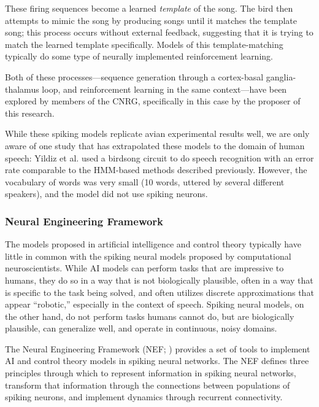 \documentclass{article}
\begin{document}
\begin{figure}\begin{center}
  \label{fig:birdsong}
  \caption{}
\end{center}\end{figure}

These firing sequences become
a learned \textit{template} of the song.
The bird then attempts to mimic the song
by producing songs until it matches
the template song;
this process occurs without
external feedback,
suggesting that it is trying
to match the learned template specifically.
Models of this template-matching
typically do some type of neurally
implemented reinforcement learning.

Both of these processes---sequence generation
through a cortex-basal ganglia-thalamus loop,
and reinforcement learning in the same context---have
been explored by members of the CNRG,
specifically in this case by
the proposer of this research.

While these spiking models
replicate avian experimental results well,
we are only aware of one study that
has extrapolated these models
to the domain of human speech:
Yildiz et al. used a birdsong
circuit to do speech recognition
with an error rate comparable
to the HMM-based methods described previously.
However, the vocabulary of words was very small
(10 words, uttered by several different speakers),
and the model did not use spiking neurons.

\subsubsection{Neural Engineering Framework}

The models proposed in
artificial intelligence and control theory typically
have little in common with the spiking neural models
proposed by computational neuroscientists.
While AI models
can perform tasks that are impressive to humans,
they do so in a way
that is not biologically plausible,
often in a way that is specific
to the task being solved,
and often utilizes discrete approximations
that appear ``robotic,'' especially
in the context of speech.
Spiking neural models,
on the other hand,
do not perform tasks humans cannot do,
but are biologically plausible,
can generalize well, and operate in
continuous, noisy domains.

The Neural Engineering Framework (NEF; \citealp{eliasmith2003})
provides a set of tools to implement
AI and control theory models
in spiking neural networks.
The NEF defines three principles
through which to represent
information in spiking neural networks,
transform that information through the connections
between populations of spiking neurons,
and implement dynamics through
recurrent connectivity.
\end{document}
